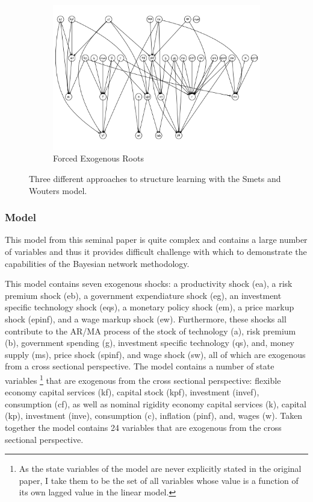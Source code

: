 \documentclass{article}
\begin{document}
\begin{figure}
    \begin{subfigure}{0.3\textwidth}
      \centering  
      \includegraphics[width=\linewidth]{images/sw_bl.png}
      \caption{Forced Exogenous Roots}
      \label{bl}
    \end{subfigure}
  
    \caption{Three different approaches to structure learning with the Smets and Wouters model.}
    \label{dag9}
  \end{figure}

\subsubsection{Model}

This model from this seminal paper is quite complex and contains a large number of variables and thus it provides difficult challenge with which to demonstrate the capabilities of the Bayesian network methodology. 

This model contains seven exogenous shocks: a productivity shock (ea), a risk premium shock (eb), a government expendiature shock (eg), an investment specific technology shock (eqs), a monetary policy shock (em), a price markup shock (epinf), and a wage markup shock (ew). Furthermore, these shocks all contribute to the AR/MA process of the stock of technology (a), risk premium (b), government spending (g), investment specific technology (qs), and, money supply (ms), price shock (spinf), and wage shock (sw), all of which are exogenous from a cross sectional perspective. The model contains a number of state variables \footnote{As the state variables of the model are never explicitly stated in the original paper, I take them to be the set of all variables whose value is a function of its own lagged value in the linear model.} that are exogenous from the cross sectional perspective: flexible economy capital services (kf), capital stock (kpf), investment (invef), consumption (cf), as well as nominal rigidity economy capital services (k), capital (kp), investment (inve), consumption (c), inflation (pinf), and, wages (w). Taken together the model contains 24 variables that are exogenous from the cross sectional perspective.
\end{document}
